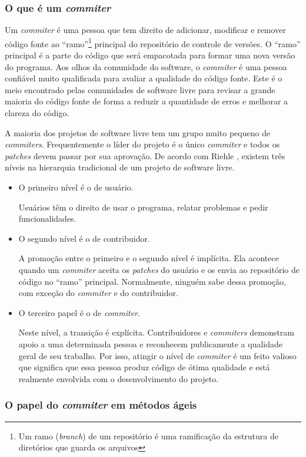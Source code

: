 \subsubsection{O que é um \emph{commiter}}

Um \emph{commiter} é uma pessoa que tem direito de adicionar,
modificar e remover código fonte ao ``ramo''\footnote{Um ramo
  (\emph{branch}) de um repositório é uma ramificação da estrutura de
  diretórios que guarda os arquivos} principal do repositório de
controle de versões. O ``ramo'' principal é a parte do código que será
empacotada para formar uma nova versão do programa. Aos olhos da
comunidade do software, o \emph{commiter} é uma pessoa confiável muito
qualificada para avaliar a qualidade do código fonte. Este é o meio
encontrado pelas comunidades de software livre para revisar a grande
maioria do código fonte de forma a reduzir a quantidade de erros e
melhorar a clareza do código.

A maioria dos projetos de software livre tem um grupo muito pequeno de
\emph{commiters}. Frequentemente o líder do projeto é o único
\emph{commiter} e todos os \emph{patches} devem passar por sua
aprovação. De acordo com Riehle \cite{Riehle2007}, existem três níveis
na hierarquia tradicional de um projeto de software livre.
\begin{itemize}
\item O primeiro nível é o de usuário.

  Usuários têm o direito de usar o programa, relatar problemas e pedir
  funcionalidades.
\item O segundo nível é o de contribuidor.

  A promoção entre o primeiro e o segundo nível é implícita. Ela
  acontece quando um \emph{commiter} aceita os \emph{patches} do
  usuário e os envia ao repositório de código no ``ramo''
  principal. Normalmente, ninguém sabe dessa promoção, com exceção do
  \emph{commiter} e do contribuidor.
\item O terceiro papel é o de \emph{commiter}.

  Neste nível, a transição é explícita. Contribuidores e
  \emph{commiters} demonstram apoio a uma determinada pessoa e
  reconhecem publicamente a qualidade geral de seu trabalho. Por isso,
  atingir o nível de \emph{commiter} é um feito valioso que significa
  que essa pessoa produz código de ótima qualidade e está realmente
  envolvida com o desenvolvimento do projeto.
\end{itemize}

\subsubsection{O papel do \emph{commiter} em métodos ágeis}


